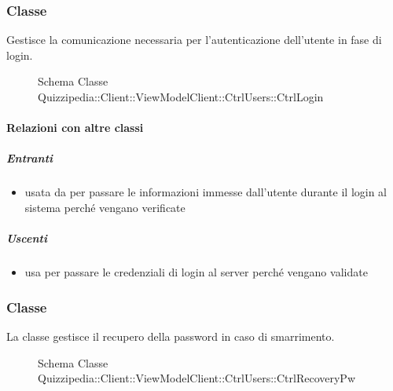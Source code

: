 \subsubsection{Classe }
Gestisce la comunicazione necessaria per l'autenticazione dell'utente in fase di login.
\begin{figure}[H]
\centering
\noindent{}
\caption[Schema Classe CtrlLogin]{Schema Classe Quizzipedia::Client::ViewModelClient::CtrlUsers::CtrlLogin}
\end{figure}
\paragraph{Relazioni con altre classi}
\subparagraph{Entranti}
\begin{itemize}
\item usata da  per passare le informazioni immesse dall'utente durante il login al sistema perché vengano verificate
\end{itemize}
\subparagraph{Uscenti}
\begin{itemize}
\item usa  per passare le credenziali di login al server perché vengano validate
\end{itemize}
\subsubsection{Classe }
La classe gestisce il recupero della password in caso di smarrimento.
\begin{figure}[H]
\centering
\noindent{}
\caption[Schema Classe CtrlRecoveryPw]{Schema Classe Quizzipedia::Client::ViewModelClient::CtrlUsers::CtrlRecoveryPw}
\end{figure}
